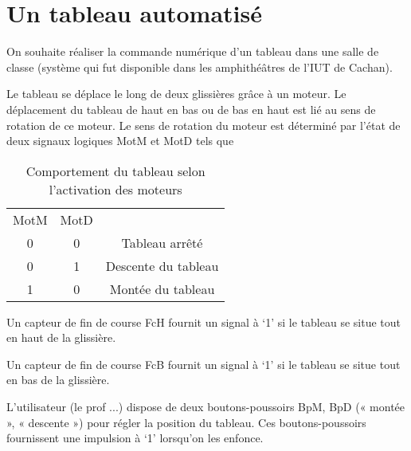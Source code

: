 \documentclass[11pt, multicol]{article}
\begin{document}
\UPSTIbuildPage


\section{Un tableau automatisé}
On souhaite réaliser la commande numérique d’un tableau dans une salle de classe (système qui fut disponible
dans les amphithéâtres de l’IUT de Cachan).

Le tableau se déplace le long de deux glissières grâce à un moteur. Le déplacement du tableau de haut en bas ou
de bas en haut est lié au sens de rotation de ce moteur. Le sens de rotation du moteur est déterminé par l’état de
deux signaux logiques MotM et MotD tels que

\begin{table}[hb]
\centering
  \begin{tabular}{c|c|c}
    MotM & MotD &\\
    0     & 0   & Tableau arrêté\\
    0&1&Descente du tableau\\
    1&0&Montée du tableau
  \end{tabular}
  \caption{Comportement du tableau selon l'activation des moteurs}
  \label{tab:sortieTableau}
\end{table}

Un capteur de fin de course FcH fournit un signal à ‘1’ si le tableau se situe tout en haut de la glissière.

Un capteur de fin de course FcB fournit un signal à ‘1’ si le tableau se situe tout en bas de la glissière.

L’utilisateur (le prof ...) dispose de deux boutons-poussoirs BpM, BpD (« montée », « descente ») pour régler la
position du tableau. Ces boutons-poussoirs fournissent une impulsion à ‘1’ lorsqu’on les enfonce.






\end{document}

